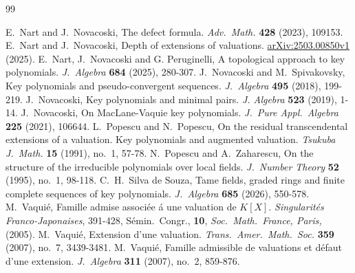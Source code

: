 \documentclass[11pt]{amsart}
\theoremstyle{definition}
\theoremstyle{remark}
\numberwithin{equation}{section}
\begin{document}
\begin{thebibliography}{99}
		
	 E.\ Nart and J.\ Novacoski, The defect formula. {\it Adv.\ Math.} {\bf 428} (2023), 109153.
	 E.\ Nart and J.\ Novacoski, Depth of extensions of valuations. \hyperlink{https://arxiv.org/abs/2503.00850}{arXiv:2503.00850v1} (2025).
	 E.\ Nart, J.\ Novacoski and G. Peruginelli, A topological approach to key polynomials.  {\it	J.\ Algebra} {\bf 684} (2025), 280-307.
	 J.\ Novacoski and M.\  Spivakovsky,  Key polynomials and pseudo-convergent sequences. {\it J.\  Algebra} {\bf 495} (2018), 199-219.
	 J.\  Novacoski,  Key polynomials and minimal pairs. {\it J.   Algebra} {\bf 523} (2019), 1-14.
	 J.\ Novacoski,  On MacLane-Vaquie key polynomials. {\it J.\   Pure Appl.\  Algebra} {\bf 225} (2021), 106644.
 L.\ Popescu and N.\  Popescu,   On the residual transcendental extensions of a valuation.  Key polynomials and augmented valuation. {\it Tsukuba J.\  Math.} {\bf 15} (1991), no.\ 1,  57-78.
  N.\ Popescu and A.\ Zaharescu,  On the structure of the irreducible polynomials over local fields. {\it  J.\  Number Theory} {\bf 52} (1995), no.\  1, 98-118.
 C.\ H.\ Silva de Souza, Tame fields, graded rings and finite complete sequences of key polynomials. {\it J.\ Algebra} {\bf 685} (2026), 550-578.
 M.\ Vaqui\'e, Famille admise associ\'ee \'a une valuation de $K[X].$ {\it Singularit\'es Franco-Japonaises}, 391-428, S\'emin.\  Congr., {\bf 10},  {\it Soc.\ Math.\ France, Paris,}  (2005).
		  M.\ Vaqui\'e,   Extension d'une valuation. {\it Trans.\  Amer.\  Math.\  Soc.} {\bf 359} (2007), no.\  7, 3439-3481.
		  M.\ Vaqui\'e,   Famille admissible de valuations et d\'efaut d'une extension. {\it J.\  Algebra} {\bf 311} (2007), no.\  2, 859-876.
			\end{thebibliography}
\end{document}
